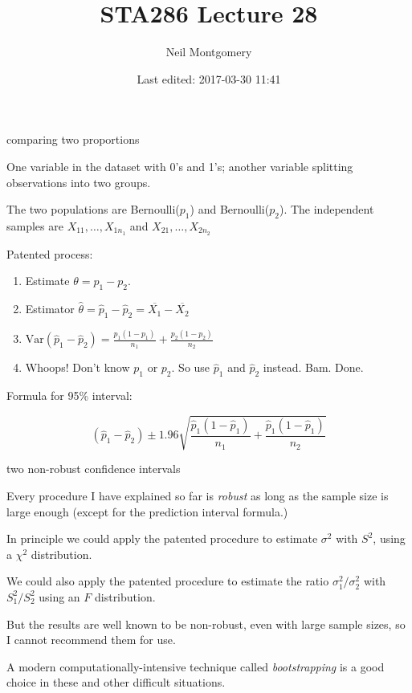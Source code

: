 \documentclass[ignorenonframetext,aspectratio=169]{beamer}
\title{STA286 Lecture 28}
\author{Neil Montgomery}
\date{Last edited: 2017-03-30 11:41}
\newcommand\V[1]{\text{Var}\!\left(#1\right)}
\newcommand\ol{\overline}
\begin{document}
\frame{\titlepage}

\begin{frame}{comparing two proportions}

One variable in the dataset with 0's and 1's; another variable splitting
observations into two groups.

The two populations are Bernoulli(\(p_1\)) and Bernoulli(\(p_2\)). The
independent samples are \(X_{11},\ldots,X_{1n_1}\) and
\(X_{21},\ldots,X_{2n_2}\)

Patented process:

\begin{enumerate}[<+->]
\def\labelenumi{\arabic{enumi}.}
\item
  Estimate \(\theta = p_1 - p_2\).
\item
  Estimator \(\hat\theta = \hat p_1 - \hat p_2 = \ol{X_1} - \ol{X_2}\)
\item
  \(\V{\hat p_1 - \hat p_2} = \frac{p_1(1-p_1)}{n_1} + \frac{p_2(1-p_2)}{n_2}\)
\item
  Whoops! Don't know \(p_1\) or \(p_2\). So use \(\hat p_1\) and
  \(\hat p_2\) instead. Bam. Done.
\end{enumerate}

\pause Formula for 95\% interval:

\[(\hat p_1 - \hat p_2) \pm 1.96\sqrt{\frac{\hat p_1(1-\hat p_1)}{n_1} + \frac{\hat p_1(1- \hat p_1)}{n_2}}\]

\end{frame}

\begin{frame}{two non-robust confidence intervals}

Every procedure I have explained so far is \textit{robust} as long as
the sample size is large enough (except for the prediction interval
formula.)

In principle we could apply the patented procedure to estimate
\(\sigma^2\) with \(S^2\), using a \(\chi^2\) distribution.

We could also apply the patented procedure to estimate the ratio
\(\sigma_1^2/\sigma_2^2\) with \(S_1^2/S_2^2\) using an \(F\)
distribution.

But the results are well known to be non-robust, even with large sample
sizes, so I cannot recommend them for use.

\pause A modern computationally-intensive technique called
\textit{bootstrapping} is a good choice in these and other difficult
situations.

\end{frame}
\end{document}
